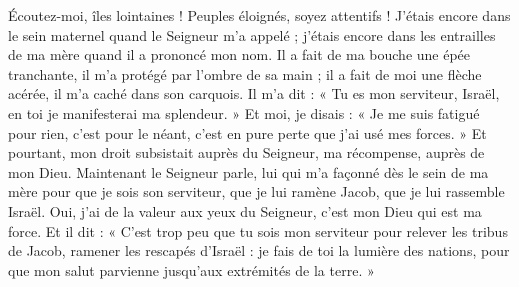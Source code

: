 Écoutez-moi, îles lointaines ! Peuples éloignés, soyez attentifs ! J’étais encore dans le sein maternel quand le Seigneur m’a appelé ; j’étais encore dans les entrailles de ma mère quand il a prononcé mon nom.
Il a fait de ma bouche une épée tranchante, il m’a protégé par l’ombre de sa main ; il a fait de moi une flèche acérée, il m’a caché dans son carquois.
Il m’a dit : « Tu es mon serviteur, Israël, en toi je manifesterai ma splendeur. »
Et moi, je disais : « Je me suis fatigué pour rien, c’est pour le néant, c’est en pure perte que j’ai usé mes forces. » Et pourtant, mon droit subsistait auprès du Seigneur, ma récompense, auprès de mon Dieu.
Maintenant le Seigneur parle, lui qui m’a façonné dès le sein de ma mère pour que je sois son serviteur, que je lui ramène Jacob, que je lui rassemble Israël. Oui, j’ai de la valeur aux yeux du Seigneur, c’est mon Dieu qui est ma force.
Et il dit : « C’est trop peu que tu sois mon serviteur pour relever les tribus de Jacob, ramener les rescapés d’Israël : je fais de toi la lumière des nations, pour que mon salut parvienne jusqu’aux extrémités de la terre. »
